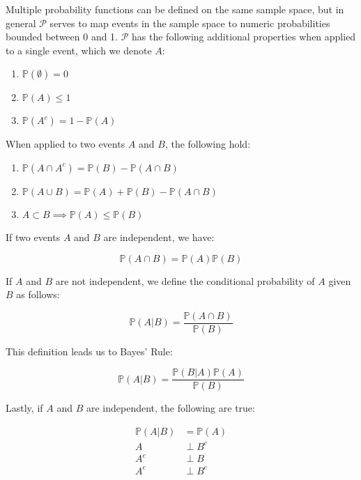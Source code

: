 \documentclass{report}
\begin{document}
Multiple probability functions can be defined on the same sample space, but in general $\mathcal{P}$ serves to map events in the sample space to numeric probabilities bounded between 0 and 1. $\mathcal{P}$ has the following additional properties when applied to a single event, which we denote $A$:

\begin{enumerate}
    \item $\mathbb{P}(\emptyset) = 0$
    \item $\mathbb{P}(A) \leq 1$
    \item $\mathbb{P}(A^c) = 1 - \mathbb{P}(A)$
\end{enumerate}

When applied to two events $A$ and $B$, the following hold:

\begin{enumerate}
    \item $\mathbb{P}(A \cap A^c) = \mathbb{P}(B) - \mathbb{P}(A \cap B)$
    \item $\mathbb{P}(A \cup B) = \mathbb{P}(A) + \mathbb{P}(B) - \mathbb{P}(A \cap B)$
    \item $A \subset B \implies \mathbb{P}(A) \leq \mathbb{P}(B)$
\end{enumerate}

If two events $A$ and $B$ are independent, we have:

\begin{equation}\label{eq:independence-1}
    \mathbb{P}(A \cap B) = \mathbb{P}(A) \mathbb{P}(B)
\end{equation}

If $A$ and $B$ are not independent, we define the conditional probability of $A$ given $B$ as follows:

\begin{equation}\label{eq:conditional-prob}
    \mathbb{P}(A|B) = \frac{\mathbb{P}(A \cap B)}{\mathbb{P}(B)}
\end{equation}

This definition leads us to Bayes' Rule:

\begin{equation}\label{eq:bayes-rule-for-sets}
    \mathbb{P}(A|B) = \frac{\mathbb{P}(B|A)\mathbb{P}(A)}{\mathbb{P}(B)} 
\end{equation}

Lastly, if $A$ and $B$ are independent, the following are true:

\begin{equation}\label{eq:independence-2}
    \begin{aligned}
        \mathbb{P}(A|B) &= \mathbb{P}(A) \\
        A &\perp B^c \\
        A^c &\perp B \\
        A^c &\perp B^c \\
    \end{aligned}
\end{equation}
\end{document}
